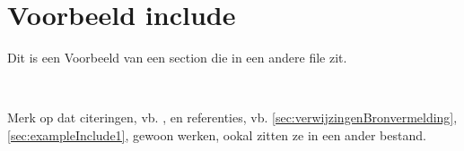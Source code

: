 \section*{Voorbeeld include}
    Dit is een Voorbeeld van een section die in een andere file zit.

    \

    Merk op dat citeringen, vb. \cite{oetiker1995not}, en referenties, vb. \ref{sec:verwijzingenBronvermelding}, \ref{sec:exampleInclude1}, gewoon werken, ookal zitten ze in een ander bestand.
